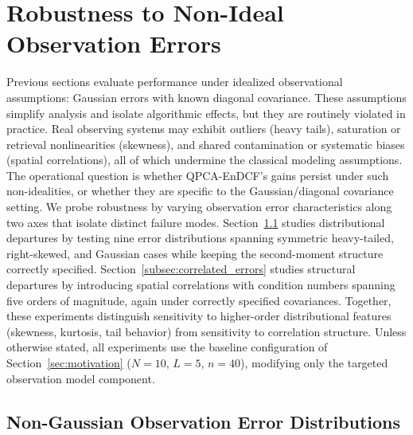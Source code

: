 \documentclass[11pt,a4paper]{article}
\begin{document}
\section{Robustness to Non-Ideal Observation Errors}
\label{sec:robustness}

Previous sections evaluate performance under idealized observational assumptions: Gaussian errors with known diagonal covariance. These assumptions simplify analysis and isolate algorithmic effects, but they are routinely violated in practice. Real observing systems may exhibit outliers (heavy tails), saturation or retrieval nonlinearities (skewness), and shared contamination or systematic biases (spatial correlations), all of which undermine the classical modeling assumptions. The operational question is whether QPCA-EnDCF’s gains persist under such non-idealities, or whether they are specific to the Gaussian/diagonal covariance setting. We probe robustness by varying observation error characteristics along two axes that isolate distinct failure modes. Section~\ref{subsec:nongaussian} studies distributional departures by testing nine error distributions spanning symmetric heavy-tailed, right-skewed, and Gaussian cases while keeping the second-moment structure correctly specified. Section~\ref{subsec:correlated_errors} studies structural departures by introducing spatial correlations with condition numbers spanning five orders of magnitude, again under correctly specified covariances. Together, these experiments distinguish sensitivity to higher-order distributional features (skewness, kurtosis, tail behavior) from sensitivity to correlation structure. Unless otherwise stated, all experiments use the baseline configuration of Section~\ref{sec:motivation} ($N=10$, $L=5$, $n=40$), modifying only the targeted observation model component.

\subsection{Non-Gaussian Observation Error Distributions}
\label{subsec:nongaussian}
\end{document}
